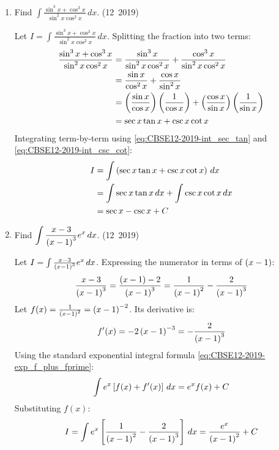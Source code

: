 \begin{enumerate}[label=\thesubsection.\arabic*, ref=\thesubsection.\theenumi]
\item Find $\displaystyle\int \frac{\sin^3 x + \cos^3 x}{\sin^2 x \cos^2 x}\,dx$.
\hfill (12~2019)

\solution
Let $I = \int \frac{\sin^3 x + \cos^3 x}{\sin^2 x \cos^2 x}\,dx$.
Splitting the fraction into two terms:
\begin{align}
	\frac{\sin^3 x + \cos^3 x}{\sin^2 x \cos^2 x} &= \frac{\sin^3 x}{\sin^2 x \cos^2 x} + \frac{\cos^3 x}{\sin^2 x \cos^2 x} \\
	&= \frac{\sin x}{\cos^2 x} + \frac{\cos x}{\sin^2 x} \\
	&= \left(\frac{\sin x}{\cos x}\right)\left(\frac{1}{\cos x}\right) + \left(\frac{\cos x}{\sin x}\right)\left(\frac{1}{\sin x}\right) \\
	&= \sec x \tan x + \csc x \cot x
\end{align}
Integrating term-by-term using \eqref{eq:CBSE12-2019-int_sec_tan} and \eqref{eq:CBSE12-2019-int_csc_cot}:
\begin{align}
	I &= \int \left(\sec x \tan x + \csc x \cot x\right)\,dx \\
	&= \int \sec x \tan x\,dx + \int \csc x \cot x\,dx \\
	&= \sec x - \csc x + C
\end{align}


\item Find $\displaystyle\int \frac{x - 3}{\left(x - 1\right)^3} e^x\,dx$.
\hfill (12~2019)

\solution
Let $I = \int \frac{x - 3}{\left(x - 1\right)^3} e^x\,dx$.
Expressing the numerator in terms of $\left(x - 1\right)$:
\begin{align}
	\frac{x - 3}{\left(x - 1\right)^3} = \frac{\left(x - 1\right) - 2}{\left(x - 1\right)^3} = \frac{1}{\left(x - 1\right)^2} - \frac{2}{\left(x - 1\right)^3}
\end{align}
Let $f(x) = \frac{1}{\left(x - 1\right)^2} = \left(x - 1\right)^{-2}$. Its derivative is:
\begin{align}
	f'(x) = -2\left(x - 1\right)^{-3} = -\frac{2}{\left(x - 1\right)^3}
\end{align}
Using the standard exponential integral formula \eqref{eq:CBSE12-2019-exp_f_plus_fprime}:
\begin{align}
	\int e^x {}\left[f(x) + f'(x)\right]\,dx = e^x f(x) + C
\end{align}
Substituting $f(x)$:
\begin{align}
	I = \int e^x {}\left[\frac{1}{\left(x - 1\right)^2} - \frac{2}{\left(x - 1\right)^3}\right]\,dx = \frac{e^x}{\left(x - 1\right)^2} + C
\end{align}



\end{enumerate}
